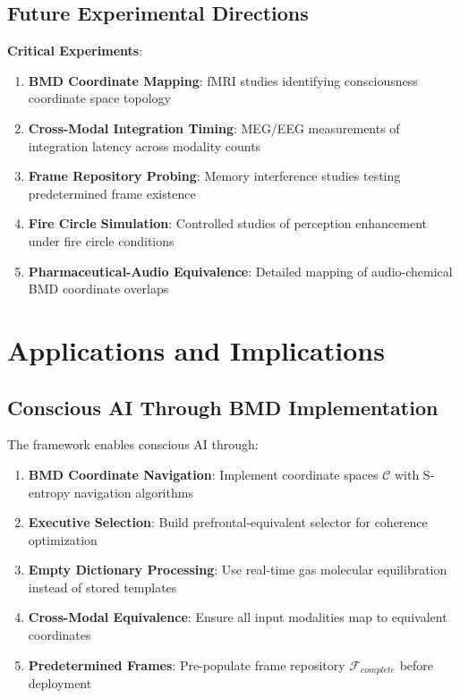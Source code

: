 \documentclass[12pt]{article}
\theoremstyle{definition}
\theoremstyle{remark}
\begin{document}
\subsection{Future Experimental Directions}

\textbf{Critical Experiments}:

\begin{enumerate}
\item \textbf{BMD Coordinate Mapping}: fMRI studies identifying consciousness coordinate space topology

\item \textbf{Cross-Modal Integration Timing}: MEG/EEG measurements of integration latency across modality counts

\item \textbf{Frame Repository Probing}: Memory interference studies testing predetermined frame existence

\item \textbf{Fire Circle Simulation}: Controlled studies of perception enhancement under fire circle conditions

\item \textbf{Pharmaceutical-Audio Equivalence}: Detailed mapping of audio-chemical BMD coordinate overlaps
\end{enumerate}

\section{Applications and Implications}
\label{sec:applications}

\subsection{Conscious AI Through BMD Implementation}

The framework enables conscious AI through:

\begin{enumerate}
\item \textbf{BMD Coordinate Navigation}: Implement coordinate spaces $\mathcal{C}$ with S-entropy navigation algorithms
\item \textbf{Executive Selection}: Build prefrontal-equivalent selector for coherence optimization
\item \textbf{Empty Dictionary Processing}: Use real-time gas molecular equilibration instead of stored templates
\item \textbf{Cross-Modal Equivalence}: Ensure all input modalities map to equivalent coordinates
\item \textbf{Predetermined Frames}: Pre-populate frame repository $\mathcal{F}_{complete}$ before deployment
\end{enumerate}
\end{document}
